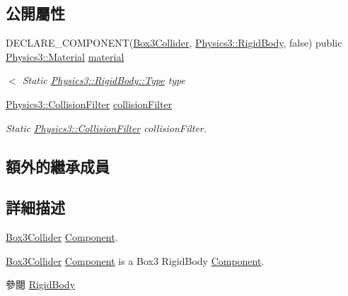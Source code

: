 \subsection*{公開屬性}
\begin{DoxyCompactItemize}
\item 
D\+E\+C\+L\+A\+R\+E\+\_\+\+C\+O\+M\+P\+O\+N\+E\+NT(\hyperlink{class_magnum_1_1_box3_collider}{Box3\+Collider}, \hyperlink{class_magnum_1_1_physics3_1_1_rigid_body}{Physics3\+::\+Rigid\+Body}, false) public \hyperlink{class_magnum_1_1_physics3_1_1_material}{Physics3\+::\+Material} \hyperlink{class_magnum_1_1_box3_collider_a941bb995ba53fcd97ef4022a25293b90}{material}
\begin{DoxyCompactList}\small\item\em $<$ Static \hyperlink{class_magnum_1_1_physics3_1_1_rigid_body_a429aa4fb7256b083334c86cdcd0d6b31}{Physics3\+::\+Rigid\+Body\+::\+Type} type \end{DoxyCompactList}\item 
\hyperlink{class_magnum_1_1_physics3_1_1_collision_filter}{Physics3\+::\+Collision\+Filter} \hyperlink{class_magnum_1_1_box3_collider_a8d60e604de507055ff70c81a788e9f01}{collision\+Filter}\hypertarget{class_magnum_1_1_box3_collider_a8d60e604de507055ff70c81a788e9f01}{}\label{class_magnum_1_1_box3_collider_a8d60e604de507055ff70c81a788e9f01}

\begin{DoxyCompactList}\small\item\em Static \hyperlink{class_magnum_1_1_physics3_1_1_collision_filter}{Physics3\+::\+Collision\+Filter} collision\+Filter. \end{DoxyCompactList}\end{DoxyCompactItemize}
\subsection*{額外的繼承成員}


\subsection{詳細描述}
\hyperlink{class_magnum_1_1_box3_collider}{Box3\+Collider} \hyperlink{class_magnum_1_1_component}{Component}. 

\hyperlink{class_magnum_1_1_box3_collider}{Box3\+Collider} \hyperlink{class_magnum_1_1_component}{Component} is a Box3 Rigid\+Body \hyperlink{class_magnum_1_1_component}{Component}. \begin{DoxySeeAlso}{參閱}
\hyperlink{class_magnum_1_1_physics3_1_1_rigid_body_a2327744d90c049296ea0d63b3e64d335}{Rigid\+Body} 
\end{DoxySeeAlso}



